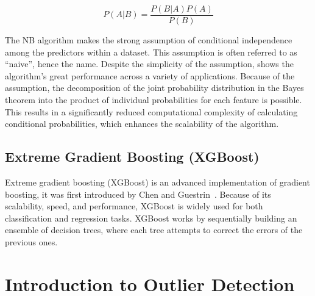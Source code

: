 \begin{equation}
    P(A|B) = \frac{P(B|A)P(A)}{P(B)}
    \label{eq:bayes}
\end{equation}

The NB algorithm makes the strong assumption of conditional independence among the predictors within a dataset. This assumption is often referred to as “naive”, hence the name. Despite the simplicity of the assumption, shows the algorithm's great performance across a variety of applications. Because of the assumption, the decomposition of the joint probability distribution in the Bayes theorem into the product of individual probabilities for each feature is possible. This results in a significantly reduced computational complexity of calculating conditional probabilities, which enhances the scalability of the algorithm.

\subsection{Extreme Gradient Boosting (XGBoost)}
Extreme gradient boosting (XGBoost) is an advanced implementation of gradient boosting, it was first introduced by Chen and Guestrin~\cite{chen_xgboost_2016}. Because of its scalability, speed, and performance, XGBoost is widely used for both classification and regression tasks. XGBoost works by sequentially building an ensemble of decision trees, where each tree attempts to correct the errors of the previous ones. 

\section{Introduction to Outlier Detection}

